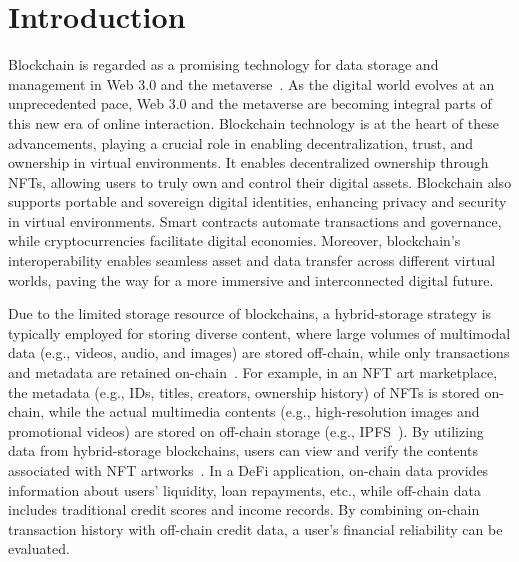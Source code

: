 \section{Introduction}
Blockchain is regarded as a promising technology for data storage and management in Web 3.0 and the metaverse~\cite{gadekallu2022blockchainmetaversereview}. 
As the digital world evolves at an unprecedented pace, Web 3.0 and the metaverse are becoming integral parts of this new era of online interaction.
Blockchain technology is at the heart of these advancements, playing a crucial role in enabling decentralization, trust, and ownership in virtual environments.
It enables decentralized ownership through NFTs, allowing users to truly own and control their digital assets.    
Blockchain also supports portable and sovereign digital identities, enhancing privacy and security in virtual environments. 
Smart contracts automate transactions and governance, while cryptocurrencies facilitate digital economies. 
Moreover, blockchain's interoperability enables seamless asset and data transfer across different virtual worlds, paving the way for a more immersive and interconnected digital future.


Due to the limited storage resource of blockchains, a hybrid-storage strategy is typically employed for storing diverse content, where large volumes of multimodal data (e.g., videos, audio, and images) are stored off-chain, while only transactions and metadata are retained on-chain~\cite{arer2022efficient,liu2024mpv,MSTDB2023,zhu2019sebdb}. 
For example, in an NFT art marketplace, the metadata (e.g., IDs, titles, creators, ownership history) of NFTs is stored on-chain, while the actual multimedia contents (e.g., high-resolution images and promotional videos) are stored on off-chain storage (e.g., IPFS~\cite{benet2014ipfscontentaddressed}). 
By utilizing data from hybrid-storage blockchains, users can view and verify the contents associated with NFT artworks~\cite{grtandnfts23}.
In a DeFi application, on-chain data provides information about users' liquidity, loan repayments, etc., while off-chain data includes traditional credit scores and income records. By combining on-chain transaction history with off-chain credit data, a user's financial reliability can be evaluated.


